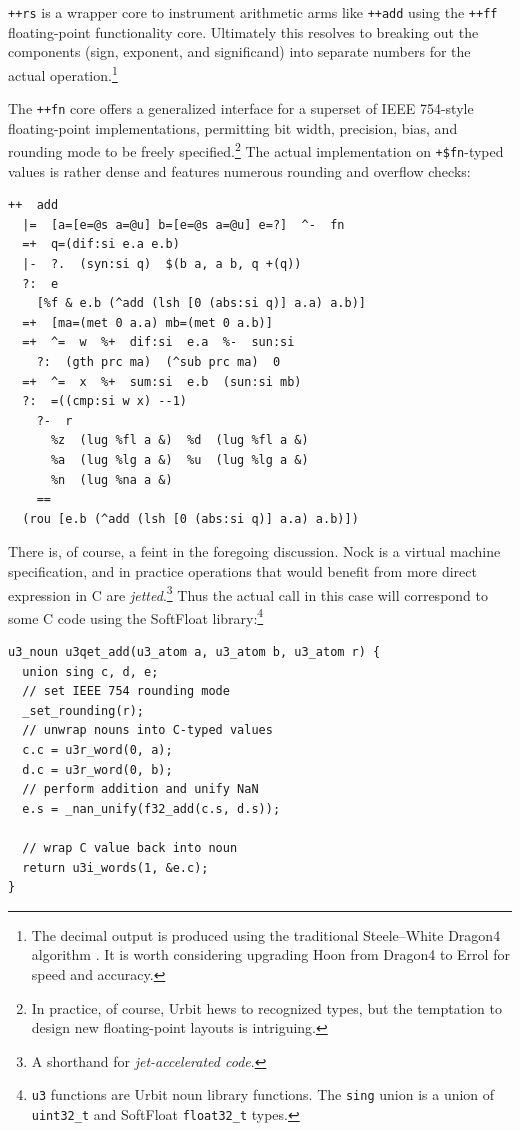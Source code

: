 \documentclass[twoside]{article}
\begin{document}
\texttt{++rs} is a wrapper core to instrument arithmetic arms like \texttt{++add} using the \texttt{++ff} floating-point functionality core.  Ultimately this resolves to breaking out the components (sign, exponent, and significand) into separate numbers for the actual operation.\footnote{The decimal output is produced using the traditional Steele–White Dragon4 algorithm \citep{Steele1991}.  It is worth considering upgrading Hoon from Dragon4 to Errol \citep{Andrysco2016} for speed and accuracy.}

The \texttt{++fn} core offers a generalized interface for a superset of IEEE 754-style floating-point implementations, permitting bit width, precision, bias, and rounding mode to be freely specified.\footnote{In practice, of course, Urbit hews to recognized types, but the temptation to design new floating-point layouts is intriguing.}  The actual implementation on \texttt{+\$fn}-typed values is rather dense and features numerous rounding and overflow checks:

\begin{lstlisting}
++  add
  |=  [a=[e=@s a=@u] b=[e=@s a=@u] e=?]  ^-  fn
  =+  q=(dif:si e.a e.b)
  |-  ?.  (syn:si q)  $(b a, a b, q +(q))
  ?:  e
    [%f & e.b (^add (lsh [0 (abs:si q)] a.a) a.b)]
  =+  [ma=(met 0 a.a) mb=(met 0 a.b)]
  =+  ^=  w  %+  dif:si  e.a  %-  sun:si
    ?:  (gth prc ma)  (^sub prc ma)  0
  =+  ^=  x  %+  sum:si  e.b  (sun:si mb)
  ?:  =((cmp:si w x) --1)
    ?-  r
      %z  (lug %fl a &)  %d  (lug %fl a &)
      %a  (lug %lg a &)  %u  (lug %lg a &)
      %n  (lug %na a &)
    ==
  (rou [e.b (^add (lsh [0 (abs:si q)] a.a) a.b)])
\end{lstlisting}

There is, of course, a feint in the foregoing discussion.  Nock is a virtual machine specification, and in practice operations that would benefit from more direct expression in C are \emph{jetted}.\footnote{A shorthand for \emph{jet-accelerated code}.}  Thus the actual call in this case will correspond to some C code using the SoftFloat library:\footnote{\texttt{u3} functions are Urbit noun library functions.  The \texttt{sing} union is a union of \texttt{uint32\_t} and SoftFloat \texttt{float32\_t} types.}

\lstset{language=C}
\begin{lstlisting}
u3_noun u3qet_add(u3_atom a, u3_atom b, u3_atom r) {
  union sing c, d, e;
  // set IEEE 754 rounding mode
  _set_rounding(r);
  // unwrap nouns into C-typed values
  c.c = u3r_word(0, a);
  d.c = u3r_word(0, b);
  // perform addition and unify NaN
  e.s = _nan_unify(f32_add(c.s, d.s));

  // wrap C value back into noun
  return u3i_words(1, &e.c);
}
\end{lstlisting}
\end{document}

